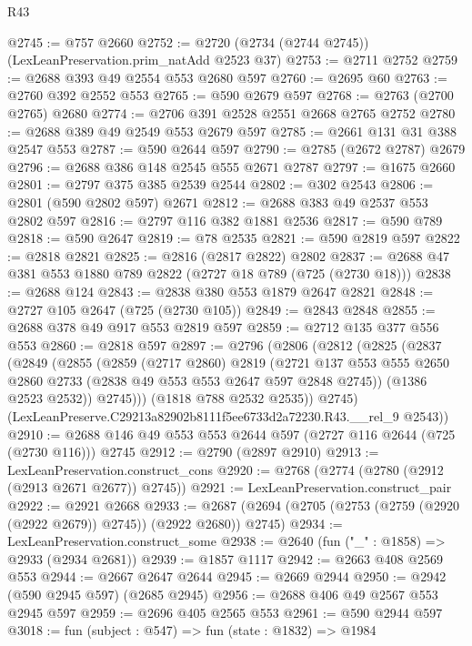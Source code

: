 \begin{lexlean}{R43}
\begin{coremodule}
@2745 := @757 @2660
@2752 := @2720 (@2734 (@2744 @2745)) (LexLeanPreservation.prim_natAdd @2523 @37)
@2753 := @2711 @2752
@2759 := @2688 @393 @49 @2554 @553 @2680 @597
@2760 := @2695 @60
@2763 := @2760 @392 @2552 @553
@2765 := @590 @2679 @597
@2768 := @2763 (@2700 @2765) @2680
@2774 := @2706 @391 @2528 @2551 @2668 @2765 @2752
@2780 := @2688 @389 @49 @2549 @553 @2679 @597
@2785 := @2661 @131 @31 @388 @2547 @553
@2787 := @590 @2644 @597
@2790 := @2785 (@2672 @2787) @2679
@2796 := @2688 @386 @148 @2545 @555 @2671 @2787
@2797 := @1675 @2660
@2801 := @2797 @375 @385 @2539 @2544
@2802 := @302 @2543
@2806 := @2801 (@590 @2802 @597) @2671
@2812 := @2688 @383 @49 @2537 @553 @2802 @597
@2816 := @2797 @116 @382 @1881 @2536
@2817 := @590 @789
@2818 := @590 @2647
@2819 := @78 @2535
@2821 := @590 @2819 @597
@2822 := @2818 @2821
@2825 := @2816 (@2817 @2822) @2802
@2837 := @2688 @47 @381 @553 @1880 @789 @2822 (@2727 @18 @789 (@725 (@2730 @18)))
@2838 := @2688 @124
@2843 := @2838 @380 @553 @1879 @2647 @2821
@2848 := @2727 @105 @2647 (@725 (@2730 @105))
@2849 := @2843 @2848
@2855 := @2688 @378 @49 @917 @553 @2819 @597
@2859 := @2712 @135 @377 @556 @553
@2860 := @2818 @597
@2897 := @2796
    (@2806
      (@2812
        (@2825
          (@2837
            (@2849
              (@2855
                (@2859
                  (@2717 @2860)
                  @2819
                  (@2721
                    @137
                    @553
                    @555
                    @2650
                    @2860
                    @2733
                    (@2838 @49 @553 @553 @2647 @597 @2848 @2745))
                  (@1386 @2523 @2532))
                @2745)))
          (@1818 @788 @2532 @2535))
        @2745)
      (LexLeanPreserve.C29213a82902b8111f5ee6733d2a72230.R43.__rel_9 @2543))
@2910 := @2688 @146 @49 @553 @553 @2644 @597 (@2727 @116 @2644 (@725 (@2730 @116))) @2745
@2912 := @2790 (@2897 @2910)
@2913 := LexLeanPreservation.construct_cons
@2920 := @2768 (@2774 (@2780 (@2912 (@2913 @2671 @2677)) @2745))
@2921 := LexLeanPreservation.construct_pair
@2922 := @2921 @2668
@2933 := @2687 (@2694 (@2705 (@2753 (@2759 (@2920 (@2922 @2679)) @2745)) (@2922 @2680)) @2745)
@2934 := LexLeanPreservation.construct_some
@2938 := @2640 (fun ("_" : @1858) => @2933 (@2934 @2681))
@2939 := @1857 @1117
@2942 := @2663 @408 @2569 @553
@2944 := @2667 @2647 @2644
@2945 := @2669 @2944
@2950 := @2942 (@590 @2945 @597) (@2685 @2945)
@2956 := @2688 @406 @49 @2567 @553 @2945 @597
@2959 := @2696 @405 @2565 @553
@2961 := @590 @2944 @597
@3018 := fun (subject : @547) =>
  fun (state : @1832) =>
  @1984

\end{coremodule}
\end{lexlean}
